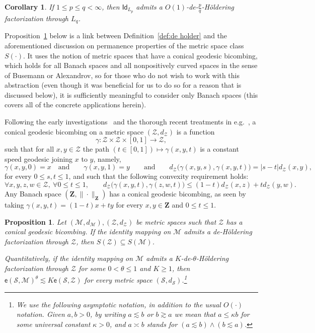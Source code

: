 \documentclass[11pt,reqno]{amsart}
\newtheorem{prop}[theorem]{Proposition}
\newtheorem{corollary}[theorem]{Corollary}
\renewcommand{\le}{\leqslant}
\renewcommand{\ge}{\geqslant}
\renewcommand{\subset}{\subseteq}
\newcommand{\ee}{\mathsf{e}}
\newcommand{\cZ}{\mathcal{Z}}
\newcommand{\Id}{\mathsf{Id}}
\newcommand{\MM}{\mathcal{M}}
\renewcommand{\SS}{\mathscr{S}}
\newcommand{\bZ}{\mathbf{Z}}
\begin{document}
\begin{corollary}\label{coro:Lp case} If $1\le p\le q<\infty$, then $\Id_{L_p}$ admits a $O(1)$-de-$\frac{p}{q}$-H\"oldering factorization through $L_q$.
\end{corollary}

Proposition~\ref{prop:def to ext}  below is a  link between Definition~\ref{def:de holder} and the aforementioned discussion on permanence properties of the metric space class $S(\cdot)$. It uses the notion of metric spaces that have a conical geodesic bicombing, which holds for all Banach spaces and all nonpositively curved spaces in the sense of Busemann  or Alexandrov, so for those who do not wish to work with this abstraction (even though it was beneficial for us to do so for a reason that is discussed below), it is sufficiently meaningful  to consider only Banach spaces (this covers all of the concrete applications herein). 

Following the early investigations~\cite{Bus48,Bus55,Ito79,Bus87,ECHLPT92} and the thorough recent treatments in e.g.~\cite{Lan13,DL15,Bas18}, a conical geodesic bicombing on a metric space $(\cZ,d_\cZ)$ is a function 
\begin{equation}\label{eq:bicombing1}
\gamma:\cZ\times \cZ\times [0,1]\to \cZ,
\end{equation}
 such that for all $x,y\in \cZ$  the path $(t\in [0,1])\mapsto \gamma(x,y,t)$ is a constant speed geodesic joining  $x$ to $y$, namely, 
 \begin{equation}\label{eq:bicombing2}
 \gamma(x,y,0)=x\quad\mathrm{and} \qquad \gamma(x,y,1)=y\qquad \mathrm{and}\qquad  d_\cZ\big(\gamma(x,y,s), \gamma(x,y,t)\big)=|s-t|d_\cZ(x,y),
 \end{equation}
  for every $0\le s,t\le 1$, and such that  the following convexity requirement holds: 
\begin{equation}\label{eq:bicombing3}
\forall x,y,z,w\in \cZ,\ \forall 0\le t\le 1,\qquad d_\cZ\big(\gamma(x,y,t),\gamma(z,w,t)\big)\le (1-t)d_\cZ(x,z)+td_\cZ(y,w).
\end{equation}
Any Banach space $(\bZ,\|\cdot\|_\bZ)$ has a conical geodesic bicombing, as seen by taking $\gamma(x,y,t)=(1-t)x+ty$ for every $x,y\in \bZ$ and $0\le t\le 1$.  




\begin{prop}\label{prop:def to ext} Let $(\MM,d_\MM), (\cZ,d_\cZ)$ be metric spaces such that $\cZ$ has a conical geodesic bicombing. If the identity mapping  on $\MM$  admits a de-H\"oldering factorization through $\cZ$, then   $S(\cZ)\subset S(\MM)$. 

Quantitatively, if the identity mapping on $\MM$ admits  a $K$-de-$\theta$-H\"oldering factorization through  $\cZ$ for some $0<\theta\le 1$ and $K\ge 1$, then $\ee(\SS,\MM)^\theta\lesssim K\ee(\SS,\cZ)$ for every metric space $(\SS,d_\SS)$.\footnote{We use the following  asymptotic notation, in addition to  the usual $O(\cdot)$ notation. Given $a,b>0$, by writing
$a\lesssim b$ or $b\gtrsim a$ we mean that $a\le \kappa b$ for some
universal constant $\kappa>0$, and $a\asymp b$
stands for $(a\lesssim b) \wedge  (b\lesssim a)$. }
\end{prop}
\end{document}
